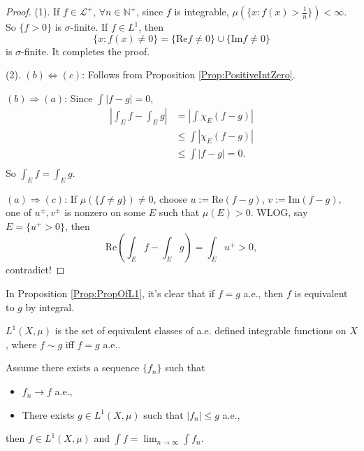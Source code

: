\begin{proof}
    (1). If $f\in\mathcal{L}^{+}$, 
    $\forall n\in\mathbb{N}^{+}$, since $f$ is integrable, 
    $\mu(\{x:f(x)>\frac{1}{n}\})<\infty$. So $\{f>0\}$ is $\sigma$-finite. 
    If $f\in L^{1}$, then 
    \begin{displaymath}
        \{x:f(x)\neq 0\}=\{\text{Re}f\neq 0\}\cup\{\text{Im}f\neq 0\}
    \end{displaymath}
    is $\sigma$-finite. It completes the proof. 

    (2). $(b)\Leftrightarrow (c)$: Follows from Proposition 
    \ref{Prop:PositiveIntZero}.

    $(b)\Rightarrow (a)$: Since $\int|f-g|=0$, 
    \begin{displaymath}
        \begin{array}{rl}
        \left|\int_{E}f-\int_{E}g\right|
        &=\left|\int\chi_{E}(f-g)\right|\\
        &\le\int\left|\chi_{E}(f-g)\right|\\
        &\le\int|f-g|=0.\\
        \end{array}
    \end{displaymath}
    So $\int_{E}f=\int_{E}g$. 

    $(a)\Rightarrow (c)$: If $\mu(\{f\neq g\})\neq 0$, 
    choose $u:=\text{Re}(f-g)$, $v:=\text{Im}(f-g)$, 
    one of $u^{\pm},v^{\pm}$ is nonzero on some $E$ such that $\mu(E)>0$. 
    WLOG, say $E=\{u^{+}>0\}$, then 
    \begin{displaymath}
        \text{Re}\left(\int_{E}f-\int_{E}g\right)=\int_{E}u^{+}>0,
    \end{displaymath}
    contradict!
\end{proof}
\begin{rem}
    In Proposition \ref{Prop:PropOfL1}, it's clear that if $f=g$ a.e., 
    then $f$ is equivalent to $g$ by integral.
\end{rem}
\begin{defn}
    \label{Defn:L1space}
    $L^{1}(X,\mu)$ is the set of equivalent classes of 
    a.e. defined integrable functions 
    on $X$, where $f\sim g$ iff $f=g$ a.e..
\end{defn}
\begin{thm}
    Assume there exists a sequence $\{f_{n}\}$ such that 
    \begin{itemize}
        \item $f_{n}\rightarrow f$ a.e.,
        \item There exists $g\in L^{1}(X,\mu)$ such that 
        $|f_n|\le g$ a.e.,
    \end{itemize}
    then $f\in L^{1}(X,\mu)$ and 
    $\int f=\lim_{n\rightarrow\infty}\int f_{n}$.
\end{thm}
